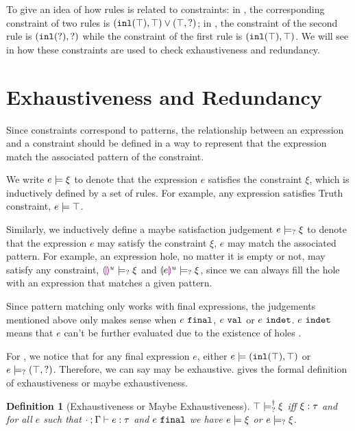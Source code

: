 \documentclass[acmsmall,screen,review,nonacm]{acmart}
\theoremstyle{slplain}
\numberwithin{thm}{section}
\newtheorem{defn}[thm]{Definition}
\begin{document}
To give an idea of how rules is related to constraints:
in , the corresponding constraint of two rules is $(\mathtt{inl}(\top) , \top) \vee (\top , \mathtt{?})$;
in , the constraint of the second rule is $(\mathtt{inl}(\mathtt{?}) , \mathtt{?})$ while the constraint of the first rule is $(\mathtt{inl}(\top) , \top)$.
We will see in  how these constraints are used to check exhaustiveness and redundancy.

\section{Exhaustiveness and Redundancy}
\label{sec:exhaustiveness-redundancy}

Since constraints correspond to patterns, the relationship between an expression and a constraint should be defined in a way to represent that the expression match the associated pattern of the constraint.

We write $e \models \xi$ to denote that the expression $e$ satisfies the constraint $\xi$, which is inductively defined by a set of rules. For example, any expression satisfies Truth constraint, $e \models \top$.

Similarly, we inductively define a maybe satisfaction judgement $e \models_{?} \xi$ to denote that the expression $e$ may satisfy the constraint $\xi$, \ie $e$ may match the associated pattern. For example, an expression hole, no matter it is empty or not, may satisfy any constraint, \ie $\textcolor{violet}{\llparenthesis}\textcolor{violet}{\rrparenthesis}^{u} \models_{?} \xi$ and $\textcolor{violet}{\llparenthesis} e\textcolor{violet}{\rrparenthesis}^{u} \models_{?} \xi$, since we can always fill the hole with an expression that matches a given pattern.

Since pattern matching only works with final expressions, the judgements mentioned above only makes sense when $e ~\mathtt{final}$, \ie $e ~\mathtt{val}$ or $e ~\mathtt{indet}$. $e ~\mathtt{indet}$ means that $e$ can't be further evaluated due to the existence of holes \cite{DBLP:journals/pacmpl/OmarVCH19}.

For , we notice that for any final expression $e$, either 
$e \models (\mathtt{inl}(\top) , \top)$ or $e \models_{?} (\top , \mathtt{?})$.
Therefore, we can say  may be exhaustive.  gives the formal definition of exhaustiveness or maybe exhaustiveness.

\begin{defn}[Exhaustiveness or Maybe Exhaustiveness]
  \label{defn:exhaustiveness}
  $\top \models_{?}^{\dag} \xi$ iff $\xi : \tau$ and for all $e$ such that $\cdot \mathbin{;} \Gamma \vdash e : \tau$ and $e ~\mathtt{final}$ we have $e \models \xi$ or $e \models_{?} \xi$.
\end{defn}
\end{document}
